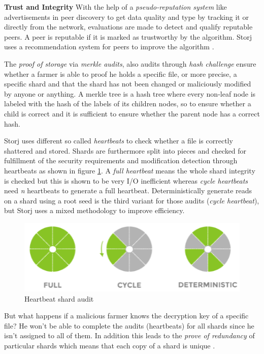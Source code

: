 \textbf{Trust and Integrity} With the help of a \textit{pseudo-reputation system} like advertisements in peer discovery to get data quality and type by tracking it or directly from the network, evaluations are made to detect and qualify reputable peers. A peer is reputable if it is marked as trustworthy by the algorithm. Storj uses a recommendation system for peers to improve the algorithm \cite{storj:PDF}.

The \textit{proof of storage} via \textit{merkle audits}, also audits through \textit{hash challenge} ensure whether a farmer is able to proof he holds a specific file, or more precise, a specific shard and that the shard has not been changed or maliciously modified by anyone or anything. A merkle tree is a hash tree where every non-leaf node is labeled with the hash of the labels of its children nodes, so to ensure whether a child is correct and it is sufficient to ensure whether the parent node has a correct hash.

Storj uses different so called \textit{heartbeats} to check whether a file is correctly shattered and stored. Shards are furthermore split into pieces and checked for fulfillment of the security requirements and modification detection through heartbeats as shown in figure \ref{storj_heartbeat}. A \textit{full heartbeat} means the whole shard integrity is checked but this is shown to be very I/O inefficient whereas \textit{cycle heartbeats} need \textsl{n} heartbeats to generate a full heartbeat. Deterministically generate reads on a shard using a root seed is the third variant for those audits (\textit{cycle heartbeat}), but Storj uses a mixed methodology to improve efficiency.

	\begin{figure}[ht]
		\begin{center}
		\includegraphics[scale=0.8]{Talk5/storj_heartbeat.PNG}
		\end{center}
		\caption{Heartbeat shard audit \cite{storj:PDF}}
		\label{storj_heartbeat}
	\end{figure}

But what happens if a malicious farmer knows the decryption key of a specific file? He won't be able to complete the audits (heartbeats) for all shards since he isn't assigned to all of them. In addition this leads to the \textit{prove of redundancy} of particular shards which means that each copy of a shard is unique \cite{storj:PDF}.

